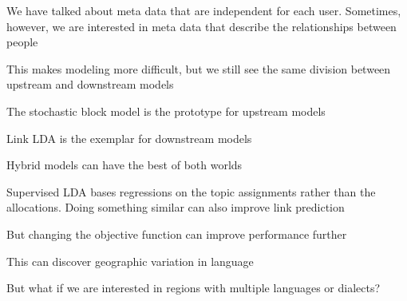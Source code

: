We have talked about meta data that are independent for each user.
Sometimes, however, we are interested in meta data that describe the
relationships between people

This makes modeling more difficult, but we still see the same division
between upstream and downstream models

The stochastic block model is the prototype for upstream models~\cite{airoldi-08}

Link LDA is the exemplar for downstream models~\cite{nallapati-08}

Hybrid models can have the best of both worlds

Supervised LDA bases regressions on the topic assignments rather than
the allocations.  Doing something similar can also improve link prediction~\citep{chang-09a}

But changing the objective function can improve performance further~\cite{bach-15}

This can discover geographic variation in language~\cite{eisenstein-10}

But what if we are interested in regions with multiple languages or
dialects?
